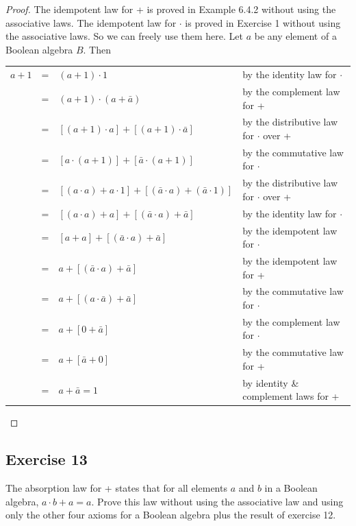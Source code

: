 \documentclass[14pt]{extarticle}
\newcommand{\cy}{\color{cyan}}
\begin{document}
\begin{proof}
The idempotent law for + is proved in Example 6.4.2 without using the associative laws. The idempotent law for $\cdot$ 
is proved in Exercise 1 without using the associative laws. So we can freely use them here. 
Let $a$ be any element of a Boolean algebra $B$. Then
\begin{center}
\begin{tabular}{rcll}
\(a + 1\) & = & \((a + 1) \cdot 1\) & {\cy by the identity law for $\cdot$} \\
& = & \((a + 1) \cdot (a + \bar{a})\) & {\cy by the complement law for +} \\
& = & \([(a + 1) \cdot a] + [(a + 1) \cdot \bar{a}]\) & {\cy by the distributive law for $\cdot$ over +} \\
& = & \([a \cdot (a + 1)] + [\bar{a} \cdot (a + 1)]\) & {\cy by the commutative law for $\cdot$} \\
& = & \([(a \cdot a) + a \cdot 1] + [(\bar{a}\cdot a) + (\bar{a}\cdot 1) ]\) & 
{\cy by the distributive law for $\cdot$ over +} \\
& = & \([(a \cdot a) + a] + [(\bar{a}\cdot a) + \bar{a}]\) & {\cy by the identity law for $\cdot$} \\
& = & \([a + a] + [(\bar{a}\cdot a) + \bar{a}]\) & {\cy by the idempotent law for $\cdot$} \\
& = & \(a + [(\bar{a}\cdot a) + \bar{a}]\) & {\cy by the idempotent law for +} \\
& = & \(a + [(a \cdot \bar{a}) + \bar{a}]\) & {\cy by the commutative law for $\cdot$} \\
& = & \(a + [0 + \bar{a}]\) & {\cy by the complement law for $\cdot$} \\
& = & \(a + [\bar{a} + 0]\) & {\cy by the commutative law for +} \\
& = & \(a + \bar{a} = 1\) & {\cy by identity \& complement laws for +}
\end{tabular}
\end{center}
\end{proof}

\subsection{Exercise 13}
The absorption law for + states that for all elements $a$ and $b$ in a Boolean algebra, \(a \cdot b + a = a\). Prove 
this law without using the associative law and using only the other four axioms for a Boolean algebra plus the result 
of exercise 12.
\end{document}
